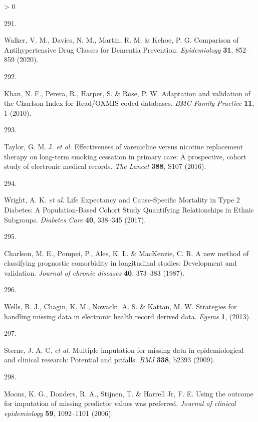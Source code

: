 \documentclass[a4paper, twoside]{templates/ociamthesis}
\newlength{\cslhangindent}
\newlength{\csllabelwidth}
\newenvironment{CSLReferences}[3] %
 {%
  \setlength{\parindent}{0pt}
  \ifodd #1 \everypar{\setlength{\hangindent}{\cslhangindent}}\ignorespaces\fi
  \ifnum #2 > 0
  \setlength{\parskip}{#2\baselineskip}
  \fi
 }%
 {}
\newcommand{\CSLLeftMargin}[1]{\parbox[t]{\maxof{\widthof{#1}}{\csllabelwidth}}{#1}}
\newcommand{\CSLRightInline}[1]{\parbox[t]{\linewidth - \csllabelwidth}{#1}}
\begin{document}
\begin{CSLReferences}{0}{0}
\leavevmode\hypertarget{ref-walker2020}{}%
\CSLLeftMargin{291. }
\CSLRightInline{Walker, V. M., Davies, N. M., Martin, R. M. \& Kehoe, P. G. Comparison of {Antihypertensive Drug Classes} for {Dementia Prevention}. \emph{Epidemiology} \textbf{31}, 852--859 (2020).}

\leavevmode\hypertarget{ref-khan2010}{}%
\CSLLeftMargin{292. }
\CSLRightInline{Khan, N. F., Perera, R., Harper, S. \& Rose, P. W. Adaptation and validation of the {Charlson Index} for {Read}/{OXMIS} coded databases. \emph{BMC Family Practice} \textbf{11}, 1 (2010).}

\leavevmode\hypertarget{ref-taylor2016}{}%
\CSLLeftMargin{293. }
\CSLRightInline{Taylor, G. M. J. \emph{et al.} Effectiveness of varenicline versus nicotine replacement therapy on long-term smoking cessation in primary care: A prospective, cohort study of electronic medical records. \emph{The Lancet} \textbf{388}, S107 (2016).}

\leavevmode\hypertarget{ref-wright2017}{}%
\CSLLeftMargin{294. }
\CSLRightInline{Wright, A. K. \emph{et al.} Life {Expectancy} and {Cause}-{Specific Mortality} in {Type} 2 {Diabetes}: A {Population}-{Based Cohort Study Quantifying Relationships} in {Ethnic Subgroups}. \emph{Diabetes Care} \textbf{40}, 338--345 (2017).}

\leavevmode\hypertarget{ref-charlson1987new}{}%
\CSLLeftMargin{295. }
\CSLRightInline{Charlson, M. E., Pompei, P., Ales, K. L. \& MacKenzie, C. R. A new method of classifying prognostic comorbidity in longitudinal studies: Development and validation. \emph{Journal of chronic diseases} \textbf{40}, 373--383 (1987).}

\leavevmode\hypertarget{ref-wells2013strategies}{}%
\CSLLeftMargin{296. }
\CSLRightInline{Wells, B. J., Chagin, K. M., Nowacki, A. S. \& Kattan, M. W. Strategies for handling missing data in electronic health record derived data. \emph{Egems} \textbf{1}, (2013).}

\leavevmode\hypertarget{ref-sterne2009}{}%
\CSLLeftMargin{297. }
\CSLRightInline{Sterne, J. A. C. \emph{et al.} Multiple imputation for missing data in epidemiological and clinical research: Potential and pitfalls. \emph{BMJ} \textbf{338}, b2393 (2009).}

\leavevmode\hypertarget{ref-moons2006}{}%
\CSLLeftMargin{298. }
\CSLRightInline{Moons, K. G., Donders, R. A., Stijnen, T. \& Harrell Jr, F. E. Using the outcome for imputation of missing predictor values was preferred. \emph{Journal of clinical epidemiology} \textbf{59}, 1092--1101 (2006).}


\end{CSLReferences}
\end{document}
